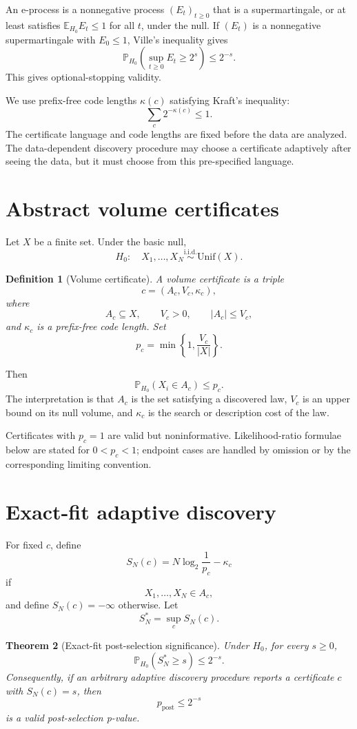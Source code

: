 \documentclass[11pt]{article}
\newtheorem{theorem}{Theorem}[section]
\newtheorem{definition}[theorem]{Definition}
\begin{document}
An e-process is a nonnegative process $(E_t)_{t\ge0}$ that is a supermartingale, or at least satisfies $\mathbb E_{H_0}E_t\le1$ for all $t$, under the null. If $(E_t)$ is a nonnegative supermartingale with $E_0\le1$, Ville's inequality gives
\[
\mathbb P_{H_0}\left(\sup_{t\ge0}E_t\ge2^s\right)\le2^{-s}.
\]
This gives optional-stopping validity.

We use prefix-free code lengths $\kappa(c)$ satisfying Kraft's inequality:
\[
\sum_c2^{-\kappa(c)}\le1.
\]
The certificate language and code lengths are fixed before the data are analyzed. The data-dependent discovery procedure may choose a certificate adaptively after seeing the data, but it must choose from this pre-specified language.

\section{Abstract volume certificates}

Let $X$ be a finite set. Under the basic null,
\[
H_0:\quad X_1,\dots,X_N\overset{\mathrm{i.i.d.}}{\sim}\mathrm{Unif}(X).
\]

\begin{definition}[Volume certificate]
A volume certificate is a triple
\[
c=(A_c,V_c,\kappa_c),
\]
where
\[
A_c\subseteq X,\qquad V_c>0,\qquad |A_c|\le V_c,
\]
and $\kappa_c$ is a prefix-free code length. Set
\[
p_c=\min\left\{1,\frac{V_c}{|X|}\right\}.
\]
\end{definition}

Then
\[
\mathbb P_{H_0}(X_i\in A_c)\le p_c.
\]
The interpretation is that $A_c$ is the set satisfying a discovered law, $V_c$ is an upper bound on its null volume, and $\kappa_c$ is the search or description cost of the law.

Certificates with $p_c=1$ are valid but noninformative. Likelihood-ratio formulae below are stated for $0<p_c<1$; endpoint cases are handled by omission or by the corresponding limiting convention.

\section{Exact-fit adaptive discovery}

For fixed $c$, define
\[
S_N(c)=N\log_2\frac1{p_c}-\kappa_c
\]
if
\[
X_1,\dots,X_N\in A_c,
\]
and define $S_N(c)=-\infty$ otherwise. Let
\[
S_N^*=\sup_c S_N(c).
\]

\begin{theorem}[Exact-fit post-selection significance]
Under $H_0$, for every $s\ge0$,
\[
\mathbb P_{H_0}(S_N^*\ge s)\le2^{-s}.
\]
Consequently, if an arbitrary adaptive discovery procedure reports a certificate $c$ with $S_N(c)=s$, then
\[
p_{\mathrm{post}}\le2^{-s}
\]
is a valid post-selection p-value.
\end{theorem}
\end{document}
